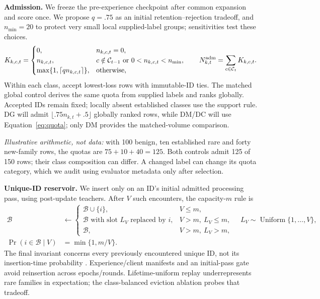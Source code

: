\documentclass[10pt,a4paper]{article}
\begin{document}
\textbf{Admission.} We freeze the pre-experience checkpoint after common expansion and score once. We propose $q=.75$ as an initial retention--rejection tradeoff, and $n_{\min}=20$ to protect very small local supplied-label groups; sensitivities test these choices.
\begin{equation}
K_{k,c,t}=\begin{cases}
0,&n_{k,c,t}=0,\\
n_{k,c,t},&c\notin\mathcal C_{t-1}\ \text{or}\ 0<n_{k,c,t}<n_{\min},\\
\max\{1,\lceil qn_{k,c,t}\rceil\},&\text{otherwise},
\end{cases}\qquad N^{\rm adm}_{k,t}=\sum_{c\in\mathcal C_t}K_{k,c,t}.
\label{eq:quota}
\end{equation}
Within each class, accept lowest-loss rows with immutable-ID ties. The matched global control derives the same quota from supplied labels and ranks globally. Accepted IDs remain fixed; locally absent established classes use the support rule. DG will admit $\lfloor .75n_{k,t}+.5\rfloor$ globally ranked rows, while DM/DC will use Equation~\eqref{eq:quota}; only DM provides the matched-volume comparison.

\emph{Illustrative arithmetic, not data:} with 100 benign, ten established rare and forty new-family rows, the quotas are $75+10+40=125$. Both controls admit 125 of 150 rows; their class composition can differ. A changed label can change its quota category, which we audit using evaluator metadata only after selection.

\textbf{Unique-ID reservoir.} We insert only on an ID's initial admitted processing pass, using post-update teachers. After $V$ such encounters, the capacity-$m$ rule is
\begin{equation}
\begin{aligned}
\mathcal B&\leftarrow\begin{cases}
\mathcal B\cup\{i\},&V\le m,\\
\mathcal B\text{ with slot }L_V\text{ replaced by }i,&V>m,\ L_V\le m,\\
\mathcal B,&V>m,\ L_V>m,
\end{cases}\quad L_V\sim\operatorname{Uniform}\{1,\ldots,V\},\\
\Pr(i\in\mathcal B\mid V)&=\min\{1,m/V\}.
\end{aligned}
\label{eq:reservoir}
\end{equation}
The final invariant concerns every previously encountered unique ID, not its insertion-time probability \cite{vitter}. Experience/client manifests and an initial-pass gate avoid reinsertion across epochs/rounds. Lifetime-uniform replay underrepresents rare families in expectation; the class-balanced eviction ablation probes that tradeoff.
\end{document}
